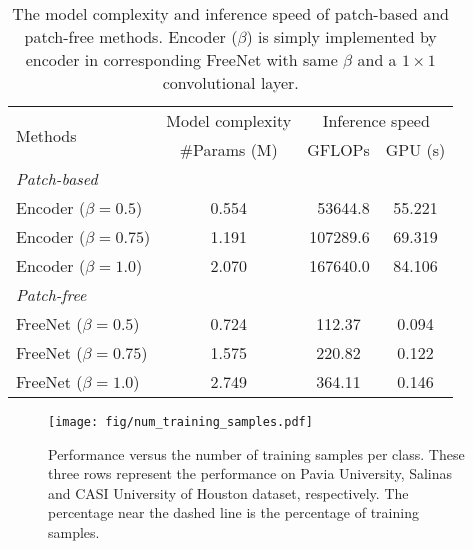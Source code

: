 \documentclass[journal]{IEEEtran}
\begin{document}
\begin{table}[hbt]
  \caption{
    The model complexity and inference speed of patch-based and patch-free methods.
    Encoder ($\beta$) is simply implemented by encoder in corresponding FreeNet with same $\beta$ and a $1\times 1$ convolutional layer.
    \label{tab:speed}}
  \centering
  \renewcommand{\arraystretch}{1.5}
  \begin{tabular}{l|c|cc}
    \hline
    \multirow{2}{*}{Methods}          & Model complexity      & \multicolumn{2}{c}{Inference speed}                        \\ \cline{2-4}
                                      & \#Params (M)          & GFLOPs                              & GPU (s)              \\ \hline
    \hspace{-5pt}\textit{Patch-based} & \multicolumn{1}{l|}{} & \multicolumn{1}{l}{}                & \multicolumn{1}{l}{} \\
    Encoder ($\beta=0.5$)             & 0.554                 & \multicolumn{1}{r}{53644.8}         & 55.221               \\
    Encoder ($\beta=0.75$)            & 1.191                 & \multicolumn{1}{r}{107289.6}        & 69.319               \\
    Encoder ($\beta=1.0$)             & 2.070                 & \multicolumn{1}{r}{167640.0}        & 84.106               \\ \hline
    \hspace{-5pt}\textit{Patch-free}  &                       &                                     &                      \\
    FreeNet ($\beta=0.5$)             & 0.724                 & 112.37                              & 0.094                \\
    FreeNet ($\beta=0.75$)            & 1.575                 & 220.82                              & 0.122                \\
    FreeNet ($\beta=1.0$)             & 2.749                 & 364.11                              & 0.146                \\ \hline
  \end{tabular}
\end{table}


\begin{figure*}[ht]
  \centering
  \texttt{[image: fig/num\_training\_samples.pdf]}
  \caption{Performance versus the number of training samples per class. 
  These three rows represent the performance on Pavia University, Salinas and CASI University of Houston dataset, respectively. 
  The percentage near the dashed line is the percentage of training samples.}
  \label{fig:num_training_samples}
\end{figure*}
\end{document}
